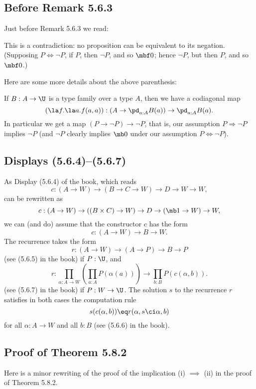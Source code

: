 \documentclass[12pt]{article}
\begin{document}

\subsection{Before Remark 5.6.3}%

Just before Remark 5.6.3 we read:

\nn\guillemotleft This is a contradiction: no proposition can be equivalent to its negation. (Supposing $P\Leftrightarrow\neg P$, if $P$, then $\neg P$, and so $\mbf0$; hence $\neg P$, but then $P$, and so $\mbf0$.)\guillemotright

Here are some more details about the above parenthesis:

If $B:A\to\U$ is a type family over a type $A$, then we have a codiagonal map 
\begin{equation}\label{563}
(\la f.\la a.f(a,a)):\left(A\to\pd_{a:A}B(a)\right)\to\pd_{a:A}B(a).
\end{equation} 
In particular we get a map $(P\to\neg P)\to\neg P$, that is, our assumption $P\Rightarrow\neg P$ implies $\neg P$ (and $\neg P$ clearly implies $\mb0$ under our assumption $P\Leftrightarrow\neg P$).


\subsection{Displays (5.6.4)--(5.6.7)}%

As Display (5.6.4) of the book, which reads 
$$
c:(A\to W)\to(B\to C\to W)\to D\to W\to W,
$$ 
can be rewritten as 
$$
c:(A\to W)\to((B\times C)\to W)\to D\to(\mb1\to W)\to W,
$$ 
we can (and do) assume that the constructor $c$ has the form 
$$
c:(A\to W)\to B\to W.
$$ 
The recurrence takes the form 
$$
r:(A\to W)\to(A\to P)\to B\to P
$$ 
(see (5.6.5) in the book) if $P:\U$, and 
$$
r:\prod_{\alpha:A\to W}\left(\prod_{a:A} P(\alpha(a))\right)\to\prod_{b:B}P(c(\alpha,b)).
$$ 
(see (5.6.7) in the book) if $P:W\to\U$. The solution $s$ to the recurrence $r$ satisfies in both cases the computation rule
$$
s(c(\alpha,b))\eq r(\alpha,s\ci\alpha,b)
$$ 
for all $\alpha:A\to W$ and all $b:B$ (see (5.6.6) in the book).


\subsection{Proof of Theorem 5.8.2}\label{582}

Here is a minor rewriting of the proof of the implication (i) $\implies$ (ii) in the proof of Theorem 5.8.2. 
\end{document}
